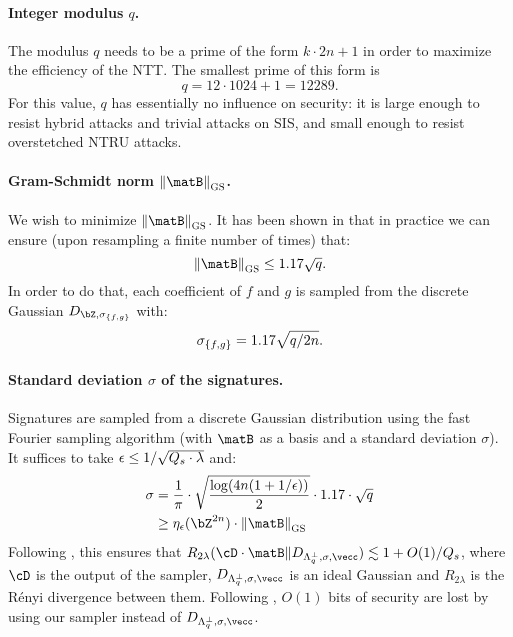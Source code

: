 \paragraph{Integer modulus $q$.} The modulus $q$ needs to be a prime of the form $k \cdot 2n + 1$ in order to maximize the efficiency of the NTT. The smallest prime of this form is
\begin{equation}\label{eq:q}
q = 12 \cdot 1024 + 1 = 12289.
\end{equation}
For this value, $q$ has essentially no influence on security: it is large enough to resist hybrid attacks and trivial attacks on SIS, and small enough to resist overstetched NTRU attacks.

\paragraph{Gram-Schmidt norm $\gsnorm{\matB}$.} We wish to minimize $\gsnorm{\matB}$. It has been shown in \cite[Section 3]{AC:DucLyuPre14} that in practice we can ensure (upon resampling a finite number of times) that:
\begin{equation}\label{eq:gsnorm}
\gsnorm{\matB} \leq 1.17 \sqrt{q}.
\end{equation}
In order to do that, each coefficient of $f$ and $g$ is sampled from the discrete Gaussian $D_{\bZ, \sigmafg}$ with:
\begin{equation}\label{eq:sigmafg}
\sigma_{\{f,g\}} = 1.17 \sqrt{q/2n}.
\end{equation}

\paragraph{Standard deviation $\sigma$ of the signatures.} Signatures are sampled from a discrete Gaussian distribution using the fast Fourier sampling algorithm (with $\matB$ as a basis and a standard deviation $\sigma$). It suffices to take $\epsilon \leq 1 / \sqrt{Q_s \cdot \lambda}$ and:
\begin{align}
\sigma & = \frac{1}{\pi} \cdot \sqrt{\frac{\log(4n (1 + 1 / \epsilon))}{2}} \cdot 1.17 \cdot \sqrt{q} \label{eq:sigma:1} \\
& \geq \smooth(\bZ^{2n}) \cdot \gsnorm{\matB} \notag \label{eq:sigma:2}
\end{align}
Following \cite[Lemma 6]{AC:Prest17}, this ensures that $R_{2\lambda}(\cD \cdot \matB \| D_{\Lambda_q^\perp, \sigma, \vecc}) \lesssim 1 + O(1) / \queries$, where $\cD$ is the output of the sampler, $D_{\Lambda_q^\perp, \sigma, \vecc}$ is an ideal Gaussian and $R_{2\lambda}$ is the R\'enyi divergence between them. Following \cite[Section 3.3]{AC:Prest17}, $O(1)$ bits of security are lost by using our sampler instead of $D_{\Lambda_q^\perp, \sigma, \vecc}$.

